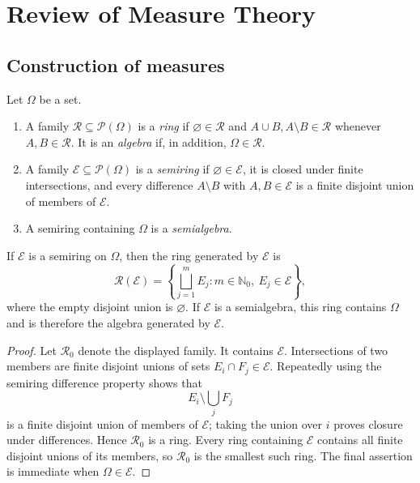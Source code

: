 \section{Review of Measure Theory}

\subsection{Construction of measures}

\begin{de}
Let $\Omega$ be a set.
\begin{enumerate}[label=(\roman*)]
  \item A family $\mathcal R\subseteq\mathcal P(\Omega)$ is a \emph{ring} if
  $\varnothing\in\mathcal R$ and $A\cup B,A\setminus B\in\mathcal R$
  whenever $A,B\in\mathcal R$. It is an \emph{algebra} if, in addition,
  $\Omega\in\mathcal R$.
  \item A family $\mathcal E\subseteq\mathcal P(\Omega)$ is a
  \emph{semiring} if $\varnothing\in\mathcal E$, it is closed under finite
  intersections, and every difference $A\setminus B$ with $A,B\in\mathcal E$
  is a finite disjoint union of members of $\mathcal E$.
  \item A semiring containing $\Omega$ is a \emph{semialgebra}.
\end{enumerate}
\end{de}

\begin{thm}
If $\mathcal E$ is a semiring on $\Omega$, then the ring generated by
$\mathcal E$ is
\[
\mathcal R(\mathcal E)
 =\left\{\bigsqcup_{j=1}^{m}E_j:
 m\in\mathbb N_0,\ E_j\in\mathcal E\right\},
\]
where the empty disjoint union is $\varnothing$. If $\mathcal E$ is a
semialgebra, this ring contains $\Omega$ and is therefore the algebra generated
by $\mathcal E$.
\end{thm}

\begin{proof}
Let $\mathcal R_0$ denote the displayed family. It contains $\mathcal E$.
Intersections of two members are finite disjoint unions of sets
$E_i\cap F_j\in\mathcal E$. Repeatedly using the semiring difference property
shows that
\[
E_i\setminus\bigcup_jF_j
\]
is a finite disjoint union of members of $\mathcal E$; taking the union over
$i$ proves closure under differences. Hence $\mathcal R_0$ is a ring. Every
ring containing $\mathcal E$ contains all finite disjoint unions of its
members, so $\mathcal R_0$ is the smallest such ring. The final assertion is
immediate when $\Omega\in\mathcal E$.
\end{proof}

